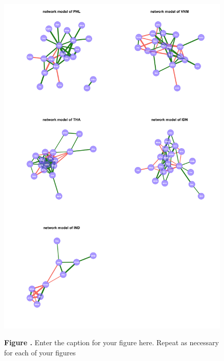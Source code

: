 \documentclass{frontiersSCNS} %
\begin{document}
\begin{figure}[h!]
\begin{center}
\includegraphics[width=15cm]{Netcountry}%
\end{center}
 \textbf{\label{Netcountry} Figure .}{ Enter the caption for your figure here.  Repeat as  necessary for each of your figures }
\end{figure}
\end{document}
